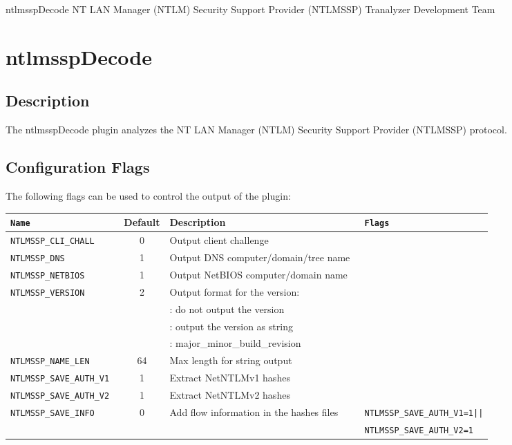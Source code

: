 \documentclass[documentation]{subfiles}
\begin{document}
\trantitle
    {ntlmsspDecode} %
    {NT LAN Manager (NTLM) Security Support Provider (NTLMSSP)} %
    {Tranalyzer Development Team} %

\section{ntlmsspDecode}\label{s:ntlmsspDecode}

\subsection{Description}
The ntlmsspDecode plugin analyzes the NT LAN Manager (NTLM) Security Support Provider (NTLMSSP) protocol.

\subsection{Configuration Flags}
The following flags can be used to control the output of the plugin:
\begin{longtable}{>{\tt}lcl>{\tt\small}l}
    \toprule
    {\bf Name} & {\bf Default} & {\bf Description} & {\bf Flags}\\
    \midrule\endhead%
    NTLMSSP\_CLI\_CHALL     & 0  & Output client challenge                  & \\
    NTLMSSP\_DNS            & 1  & Output DNS computer/domain/tree name     & \\
    NTLMSSP\_NETBIOS        & 1  & Output NetBIOS computer/domain name      & \\
    NTLMSSP\_VERSION        & 2  & Output format for the version:           & \\
                            &    & \qquad 0: do not output the version      & \\
                            &    & \qquad 1: output the version as string   & \\
                            &    & \qquad 2: major\_minor\_build\_revision  & \\
    NTLMSSP\_NAME\_LEN      & 64 & Max length for string output             & \\
    NTLMSSP\_SAVE\_AUTH\_V1 & 1  & Extract NetNTLMv1 hashes                 & \\
    NTLMSSP\_SAVE\_AUTH\_V2 & 1  & Extract NetNTLMv2 hashes                 & \\
    NTLMSSP\_SAVE\_INFO     & 0  & Add flow information in the hashes files & NTLMSSP\_SAVE\_AUTH\_V1=1||\\
                            &    &                                          & NTLMSSP\_SAVE\_AUTH\_V2=1\\
    \bottomrule
\end{longtable}
\end{document}
